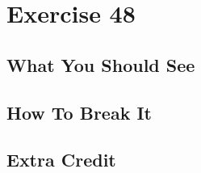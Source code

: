 \chapter{Exercise 48}


\section{What You Should See}


\section{How To Break It}


\section{Extra Credit}



